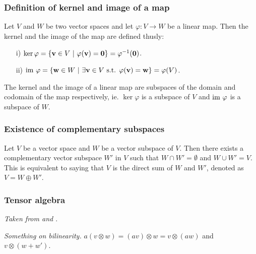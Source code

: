 	\subsubsection{Definition of kernel and image of a map}
	
	\begin{definition}\label{def:kernelimage}
		Let $V$ and $W$ be two vector spaces and let $\varphi: V \rightarrow W$ be a linear map. Then the kernel and the image of the map are defined thusly:
		\begin{itemize}
			\item[i)] $\ker \varphi = \left\lbrace \mathbf{v} \in V \ \middle\vert \ \varphi(\mathbf{v}) = \mathbf{0} \right\rbrace = \varphi^{-1}(\mathbf{0})$.
			\item[ii)] $\text{im } \varphi = \left\lbrace \mathbf{w} \in W \ \middle\vert \ \exists \mathbf{v} \in V \text{ s.t. } \varphi(\mathbf{v}) = \mathbf{w} \right\rbrace = \varphi(V)$.
		\end{itemize}
	\end{definition}
	
	\begin{remark}
		The kernel and the image of a linear map are subspaces of the domain and codomain of the map respectively, ie. $\ker \varphi$ is a subspace of $V$ and $\text{im } \varphi$ is a subspace of $W$.
	\end{remark}
	
	\subsubsection{Existence of complementary subspaces}
	
	\begin{corollary}\label{thm:compsubspaces}\cite[Cor.?.?.]{Holst}
		Let $V$ be a vector space and $W$ be a vector subspace of $V$. Then there exists a complementary vector subspace $W'$ in $V$ such that $W \cap W' = \emptyset$ and $W \cup W' = V$. This is equivalent to saying that $V$ is the direct sum of $W$ and $W'$, denoted as $V = W \oplus W'$.
	\end{corollary}

	
	\subsubsection{Tensor algebra}\label{sect:tensoralgebra}
	
		\textit{Taken from \cite{Jeevanjee} and \cite{Yokonuma}}.
		
		\textit{Something on bilinearity.} $a(v\otimes w) = (av)\otimes w = v \otimes (aw)$ and $v \otimes (w + w')$.

